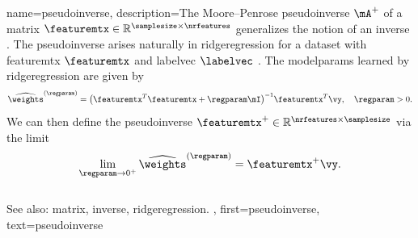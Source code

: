 
{name={pseudoinverse},
  description={The Moore–Penrose pseudoinverse $\mA^{+}$ 
 	of a \gls{matrix} $\featuremtx \in \mathbb{R}^{\samplesize \times \nrfeatures}$ 
	generalizes the notion of an \gls{inverse} \cite{GolubVanLoanBook}. 
	The pseudoinverse arises naturally in \gls{ridgeregression} for a 
	\gls{dataset} with \gls{featuremtx} $\featuremtx$ and \gls{labelvec} 
	$\labelvec$ \cite[Ch.\ 3]{hastie01statisticallearning}. 
	The \glspl{modelparam} learned by \gls{ridgeregression} 
  	are given by
  	\[
  	\widehat{\weights}^{(\regparam)}  = \big(\featuremtx^{T} \featuremtx + \regparam \mI \big)^{-1} \featuremtx^{T} \vy, \quad \regparam > 0.
  	\]
  	We can then define the pseudoinverse $\featuremtx^{+} \in \mathbb{R}^{\nrfeatures \times \samplesize}$ via 
  	the limit \cite[Ch. 3]{benisrael2003generalized}
  	\[
  	\lim_{\regparam \to 0^+} \widehat{\weights}^{(\regparam)} = \featuremtx^+ \vy.
  	\]
	\\
	See also: \gls{matrix}, \gls{inverse}, \gls{ridgeregression}. },
 first={pseudoinverse},
 text={pseudoinverse}
}

